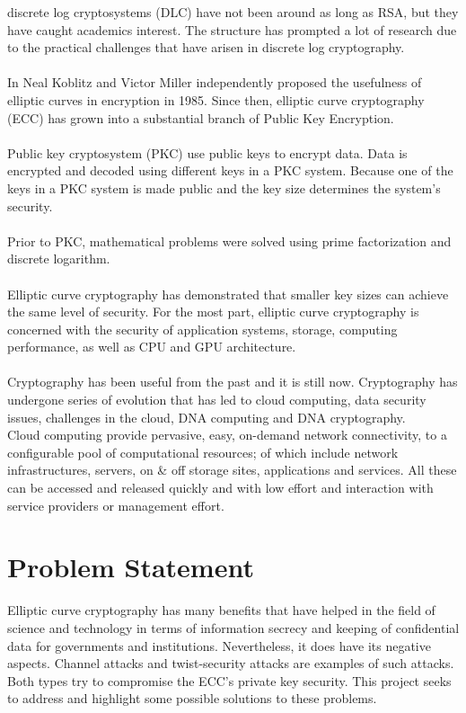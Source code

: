 discrete log cryptosystems (DLC) have not been around as long as RSA, but they have caught academics interest. The structure has prompted a lot of research due to the practical challenges that have arisen in discrete log cryptography.\\\\	
In \cite{Afreen2011} Neal Koblitz and Victor Miller  independently proposed the usefulness of elliptic curves in encryption in 1985. Since then, elliptic curve cryptography (ECC) has grown into a substantial branch of Public Key Encryption.\\\\
Public key cryptosystem (PKC) use public keys to encrypt data. Data is encrypted and decoded using different keys in a PKC system. Because one of the keys in a PKC system is made public and the key size determines the system's security.\\\\
Prior to PKC, mathematical problems were solved using prime factorization and discrete logarithm.\\\\
Elliptic curve cryptography has demonstrated that smaller key sizes can achieve the same level of security. For the most part, elliptic curve cryptography is concerned with the security of application systems, storage, computing performance, as well as CPU and GPU architecture.\\\\
Cryptography has been useful from the past and it is still now. Cryptography has undergone series of evolution that has led to cloud computing, data security issues, challenges in the cloud, DNA computing and DNA cryptography.\\
Cloud computing provide pervasive, easy, on-demand network connectivity, to a configurable pool of computational resources; of which include network infrastructures, servers, on \& off storage sites, applications  and services. All these can be accessed and released quickly and with low effort and  interaction with service providers or management effort.

\section{Problem Statement}
Elliptic curve cryptography has many benefits that have helped in the field of science and technology in terms of information secrecy and keeping of confidential data for governments and institutions. Nevertheless, it does have its negative aspects. Channel attacks and twist-security attacks are examples of such attacks. Both types try to compromise the ECC's private key security. This project seeks to address and highlight some possible solutions to these problems.\\\\


